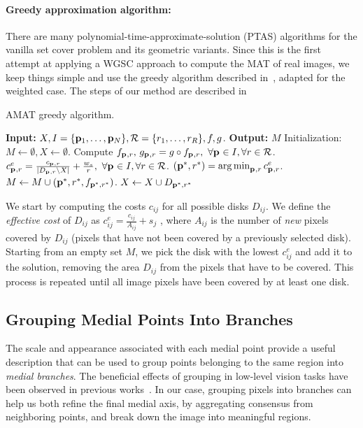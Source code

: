 \documentclass[10pt,twocolumn,letterpaper]{article}
\begin{document}
\paragraph{Greedy approximation algorithm:}
There are many polynomial-time-approximate-solution (PTAS) algorithms for the vanilla set cover problem
and its geometric variants.
Since this is the first attempt at applying a WGSC approach to compute the MAT of real images, we keep things simple
and use the greedy algorithm described in~\cite{vazirani2013approximation}, adapted for the weighted case.
The steps of our method are described in~
\begin{algorithm}[t]
\caption{AMAT greedy algorithm.}
\label{alg:greedy}
	\begin{algorithmic}[1]
	\Statex \textbf{Input:} $X,I=\{\mathbf{p}_{1},\ldots,\mathbf{p}_{N}\},\mathcal{R}=\{r_1,\ldots,r_R\},f,g$.
	\Statex \textbf{Output:} $M$
	\State Initialization: $M \leftarrow \emptyset,X \leftarrow \emptyset$.
	\State Compute $f_{\mathbf{p}_{},r},\, g_{\mathbf{p}_{},r} = g \circ f_{\mathbf{p}_{},r},\,\, \forall \mathbf{p}_{} \in I, \forall r \in \mathcal{R}$.
		\State $c_{\mathbf{p}_{},r}^e = \frac{c_{\mathbf{p}_{},r}}{|D_{\mathbf{p}_{},r} \setminus X|}+\frac{w_s}{r},\,\, \forall \mathbf{p}_{} \in I, \forall r \in \mathcal{R}$.
		\State $(\mathbf{p}_{}^{*},r^{*}) = \operatorname*{arg\,min}_{\mathbf{p}_{},r}{c_{\mathbf{p}_{},r}^e}$.		
		\State $M\leftarrow M\cup{(\mathbf{p}_{}^{*},r^{*},f_{\mathbf{p}_{}^{*},r^{*}})}$.
		\State $X \leftarrow X\cup D_{\mathbf{p}_{}^{*},r^{*}}$ 
	\EndWhile
	\end{algorithmic}
\end{algorithm}
We start by computing the costs $c_{ij}$ for all possible disks $D_{ij}$.
We define the \emph{effective cost} of $D_{ij}$ as $c_{ij}^e = \frac{c_{ij}}{A_{ij}} + s_j$ , where $A_{ij}$ is the number
of \emph{new} pixels covered by $D_{ij}$ (pixels that have not been covered by a previously selected disk).
Starting from an empty set $M$, we pick the disk with the lowest $c_{ij}^e$ and add it to the solution, 
removing the area $D_{ij}$ from the pixels that have to be covered.
This process is repeated until all image pixels have been covered by at least one disk.

\subsection{Grouping Medial Points Into Branches}\label{sec:method:grouping}
The scale and appearance associated with each medial point provide a useful
description that can be used to group points belonging to the same region into \emph{medial branches}.
The beneficial effects of grouping in low-level vision tasks have been
observed in previous works~\cite{felzenszwalb2006min,zhu2007untangling,kokkinos2010highly,qi2015making}.
In our case, grouping pixels into branches can help us both refine the final medial axis, 
by aggregating consensus from neighboring points, and break down the image into meaningful regions.
\end{document}
